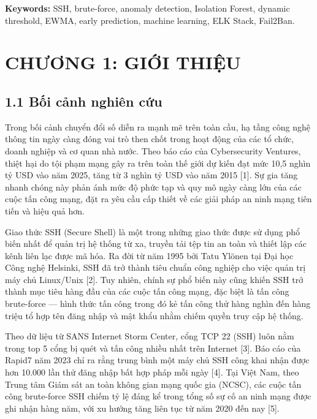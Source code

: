 \documentclass[
  a4paper]{report}
\begin{document}
\textbf{Keywords:} SSH, brute-force, anomaly detection, Isolation
Forest, dynamic threshold, EWMA, early prediction, machine learning, ELK
Stack, Fail2Ban.

\newpage

\chapter{CHƯƠNG 1: GIỚI
THIỆU}\label{chux1b0ux1a1ng-1-giux1edbi-thiux1ec7u}

\section{1.1 Bối cảnh nghiên
cứu}\label{bux1ed1i-cux1ea3nh-nghiuxean-cux1ee9u}

Trong bối cảnh chuyển đổi số diễn ra mạnh mẽ trên toàn cầu, hạ tầng công
nghệ thông tin ngày càng đóng vai trò then chốt trong hoạt động của các
tổ chức, doanh nghiệp và cơ quan nhà nước. Theo báo cáo của
Cybersecurity Ventures, thiệt hại do tội phạm mạng gây ra trên toàn thế
giới dự kiến đạt mức 10,5 nghìn tỷ USD vào năm 2025, tăng từ 3 nghìn tỷ
USD vào năm 2015 {[}1{]}. Sự gia tăng nhanh chóng này phản ánh mức độ
phức tạp và quy mô ngày càng lớn của các cuộc tấn công mạng, đặt ra yêu
cầu cấp thiết về các giải pháp an ninh mạng tiên tiến và hiệu quả hơn.

Giao thức SSH (Secure Shell) là một trong những giao thức được sử dụng
phổ biến nhất để quản trị hệ thống từ xa, truyền tải tệp tin an toàn và
thiết lập các kênh liên lạc được mã hóa. Ra đời từ năm 1995 bởi Tatu
Ylönen tại Đại học Công nghệ Helsinki, SSH đã trở thành tiêu chuẩn công
nghiệp cho việc quản trị máy chủ Linux/Unix {[}2{]}. Tuy nhiên, chính sự
phổ biến này cũng khiến SSH trở thành mục tiêu hàng đầu của các cuộc tấn
công mạng, đặc biệt là tấn công brute-force --- hình thức tấn công trong
đó kẻ tấn công thử hàng nghìn đến hàng triệu tổ hợp tên đăng nhập và mật
khẩu nhằm chiếm quyền truy cập hệ thống.

Theo dữ liệu từ SANS Internet Storm Center, cổng TCP 22 (SSH) luôn nằm
trong top 5 cổng bị quét và tấn công nhiều nhất trên Internet {[}3{]}.
Báo cáo của Rapid7 năm 2023 chỉ ra rằng trung bình một máy chủ SSH công
khai nhận được hơn 10.000 lần thử đăng nhập bất hợp pháp mỗi ngày
{[}4{]}. Tại Việt Nam, theo Trung tâm Giám sát an toàn không gian mạng
quốc gia (NCSC), các cuộc tấn công brute-force SSH chiếm tỷ lệ đáng kể
trong tổng số sự cố an ninh mạng được ghi nhận hàng năm, với xu hướng
tăng liên tục từ năm 2020 đến nay {[}5{]}.
\end{document}
